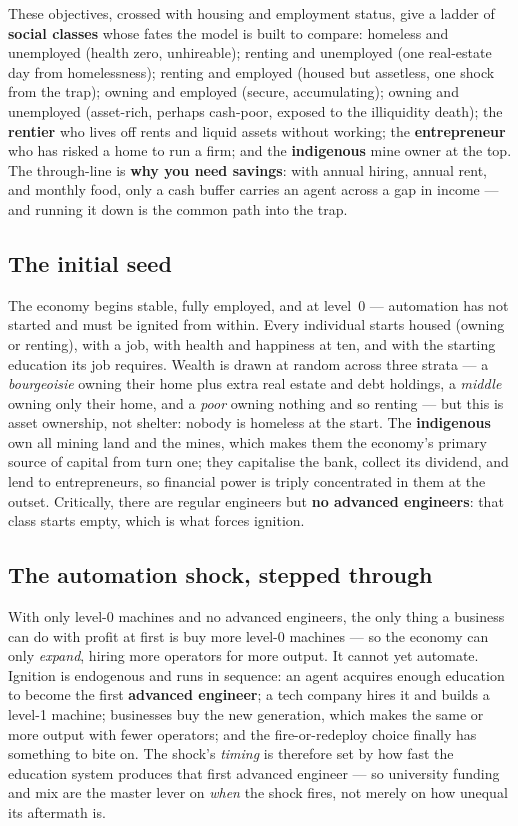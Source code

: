 \documentclass[11pt]{article}
\begin{document}
These objectives, crossed with housing and employment status, give a ladder of
\textbf{social classes} whose fates the model is built to compare: homeless and
unemployed (health zero, unhireable); renting and unemployed (one real-estate
day from homelessness); renting and employed (housed but assetless, one shock
from the trap); owning and employed (secure, accumulating); owning and
unemployed (asset-rich, perhaps cash-poor, exposed to the illiquidity death);
the \textbf{rentier} who lives off rents and liquid assets without working; the
\textbf{entrepreneur} who has risked a home to run a firm; and the
\textbf{indigenous} mine owner at the top. The through-line is \textbf{why you
need savings}: with annual hiring, annual rent, and monthly food, only a cash
buffer carries an agent across a gap in income --- and running it down is the
common path into the trap.

\subsection{The initial seed}
\label{sec:seed}

The economy begins stable, fully employed, and at level~0 --- automation has not
started and must be ignited from within. Every individual starts housed (owning
or renting), with a job, with health and happiness at ten, and with the starting
education its job requires. Wealth is drawn at random across three strata ---
a \emph{bourgeoisie} owning their home plus extra real estate and debt holdings,
a \emph{middle} owning only their home, and a \emph{poor} owning nothing and so
renting --- but this is asset ownership, not shelter: nobody is homeless at the
start. The \textbf{indigenous} own all mining land and the mines, which makes
them the economy's primary source of capital from turn one; they capitalise the
bank, collect its dividend, and lend to entrepreneurs, so financial power is
triply concentrated in them at the outset. Critically, there are regular
engineers but \textbf{no advanced engineers}: that class starts empty, which is
what forces ignition.

\subsection{The automation shock, stepped through}

With only level-0 machines and no advanced engineers, the only thing a business
can do with profit at first is buy more level-0 machines --- so the economy can
only \emph{expand}, hiring more operators for more output. It cannot yet
automate. Ignition is endogenous and runs in sequence: an agent acquires enough
education to become the first \textbf{advanced engineer}; a tech company hires it
and builds a level-1 machine; businesses buy the new generation, which makes the
same or more output with fewer operators; and the fire-or-redeploy choice
finally has something to bite on. The shock's \emph{timing} is therefore set by
how fast the education system produces that first advanced engineer --- so
university funding and mix are the master lever on \emph{when} the shock fires,
not merely on how unequal its aftermath is.
\end{document}
